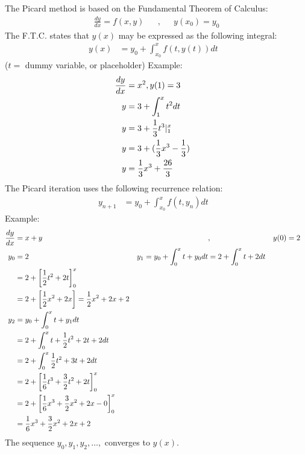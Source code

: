 			The Picard method is based on the Fundamental Theorem of Calculus:
			\begin{align}
				&\frac{dy}{dx} = f(x,y)& &,& &y(x_{0}) = y_{0}&
			\end{align}
			The F.T.C. states that $y(x)$ may be expressed as the following integral:
			\begin{align}
				y(x) &= y_{0} + \int_{x_{0}}^{x} f(t,y(t)) dt&
			\end{align}
			($t =$ dummy variable, or placeholder)
			Example:
			\begin{align}
				\frac{dy}{dx} &= x^{2}, y(1) = 3& \\
				y &= 3 + \int_{1}^{x} t^{2} dt& \\
				y &= 3 + \frac{1}{3}t^{3}|_{1}^{x}& \notag \\
				y &= 3 + (\frac{1}{3}x^{3} - \frac{1}{3})& \notag \\
				y &= \frac{1}{3}x^{3} + \frac{26}{3}&
			\end{align}
			The Picard iteration uses the following recurrence relation:
			\begin{align}
				y_{n+1} &= y_{0} + \int_{x_0}^{x} f(t,y_{n}) dt&
			\end{align}
			Example:
			\begin{align}
				\frac{dy}{dx} &= x + y& &,& &y(0) = 2& \\
				y_{0} &= 2&
				y_{1} = y_{0} + \int_{0}^{x} t + y_0 dt &= 2+\int_{0}^{x}t+2dt& \notag \\
				&= 2 + \left[\frac{1}{2}t^{2} + 2t\right]_{0}^{x}& \notag \\
				&= 2 + \left[\frac{1}{2}x^{2} + 2x\right] = \frac{1}{2}x^{2} + 2x + 2& \\
				y_{2} &= y_{0} + \int_{0}^{x} t + y_1 dt & \notag \\
				&= 2 + \int_{0}^{x} t + \frac{1}{2}t^{2} + 2t + 2 dt & \notag \\
				&= 2 + \int_{0}^{x} \frac{1}{2}t^{2} + 3t + 2 dt & \notag \\
				&= 2 + \left[\frac{1}{6}t^{3} + \frac{3}{2}t^{2} + 2t\right]_{0}^{x} & \notag \\
				&= 2 + \left[\frac{1}{6}x^{3} + \frac{3}{2}x^{2} + 2x - 0\right]_{0}^{x} & \notag \\
				&= \frac{1}{6}x^{3} + \frac{3}{2}x^{2} + 2x + 2&
			\end{align}
			The sequence $y_{0}, y_{1}, y_{2}, \dots,$ converges to $y(x)$.
